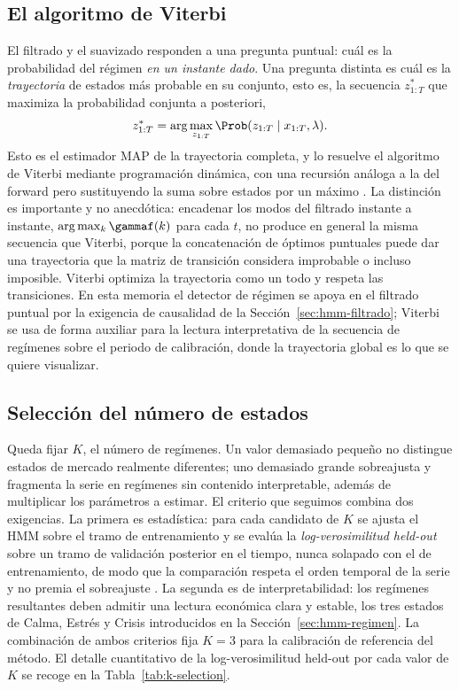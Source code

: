 \subsection{El algoritmo de Viterbi}
\label{sec:hmm-viterbi}

El filtrado y el suavizado responden a una pregunta puntual: cuál es la probabilidad del régimen \emph{en un instante dado}. Una pregunta distinta es cuál es la \emph{trayectoria} de estados más probable en su conjunto, esto es, la secuencia $z_{1:T}^{\ast}$ que maximiza la probabilidad conjunta a posteriori,
\[
z_{1:T}^{\ast} = \arg\max_{z_{1:T}} \Prob(z_{1:T} \mid x_{1:T}, \lambda).
\]
Esto es el estimador MAP de la trayectoria completa, y lo resuelve el algoritmo de Viterbi mediante programación dinámica, con una recursión análoga a la del forward pero sustituyendo la suma sobre estados por un máximo \cite{viterbi1967}. La distinción es importante y no anecdótica: encadenar los modos del filtrado instante a instante, $\arg\max_k \gammaf(k)$ para cada $t$, no produce en general la misma secuencia que Viterbi, porque la concatenación de óptimos puntuales puede dar una trayectoria que la matriz de transición considera improbable o incluso imposible. Viterbi optimiza la trayectoria como un todo y respeta las transiciones. En esta memoria el detector de régimen se apoya en el filtrado puntual por la exigencia de causalidad de la Sección~\ref{sec:hmm-filtrado}; Viterbi se usa de forma auxiliar para la lectura interpretativa de la secuencia de regímenes sobre el periodo de calibración, donde la trayectoria global es lo que se quiere visualizar.

\subsection{Selección del número de estados}
\label{sec:hmm-K}

Queda fijar $K$, el número de regímenes. Un valor demasiado pequeño no distingue estados de mercado realmente diferentes; uno demasiado grande sobreajusta y fragmenta la serie en regímenes sin contenido interpretable, además de multiplicar los parámetros a estimar. El criterio que seguimos combina dos exigencias. La primera es estadística: para cada candidato de $K$ se ajusta el HMM sobre el tramo de entrenamiento y se evalúa la \emph{log-verosimilitud held-out} sobre un tramo de validación posterior en el tiempo, nunca solapado con el de entrenamiento, de modo que la comparación respeta el orden temporal de la serie y no premia el sobreajuste \cite{rabiner1989}. La segunda es de interpretabilidad: los regímenes resultantes deben admitir una lectura económica clara y estable, los tres estados de Calma, Estrés y Crisis introducidos en la Sección~\ref{sec:hmm-regimen}. La combinación de ambos criterios fija $K = 3$ para la calibración de referencia del método. El detalle cuantitativo de la log-verosimilitud held-out por cada valor de $K$ se recoge en la Tabla~\ref{tab:k-selection}.

